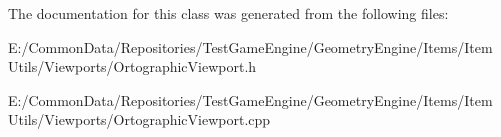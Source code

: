 The documentation for this class was generated from the following files\+:\begin{DoxyCompactItemize}
\item 
E\+:/\+Common\+Data/\+Repositories/\+Test\+Game\+Engine/\+Geometry\+Engine/\+Items/\+Item Utils/\+Viewports/Ortographic\+Viewport.\+h\item 
E\+:/\+Common\+Data/\+Repositories/\+Test\+Game\+Engine/\+Geometry\+Engine/\+Items/\+Item Utils/\+Viewports/Ortographic\+Viewport.\+cpp\end{DoxyCompactItemize}
